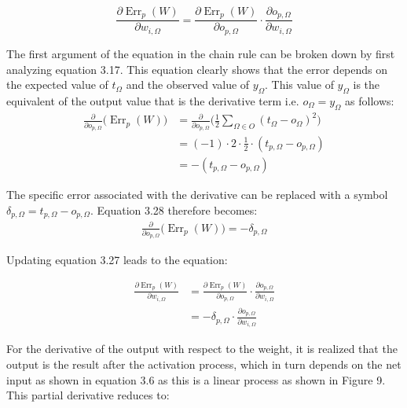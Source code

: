 \begin{equation}
\frac { \partial \operatorname { Err } _ { p } ( W ) } { \partial w _ { i , \Omega } } = \frac { \partial \operatorname { Err } _ { p } ( W ) } { \partial o _ { p , \Omega } } \cdot \frac { \partial o _ { p , \Omega } } { \partial w _ { i , \Omega } }
\end{equation}

The first argument of the equation in the chain rule can be broken down by first analyzing equation 3.17. This equation clearly shows that the error depends on the expected value of $t_{\Omega}$ and the observed value of $y_{\Omega}$. This value of $y_\Omega$ is the equivalent of the output value that is the derivative term i.e. $o_\Omega = y_\Omega$ as follows:
\begin{align}
\frac { \partial }{ \partial o _ { p , \Omega } }\Big(\operatorname { Err } _ { p } ( W )\Big) &= \frac { \partial }{ \partial o _ { p , \Omega } } \Big(\frac { 1 } { 2 } \sum _ { \Omega \in O } \left( t _ { \Omega } - o _ { \Omega } \right) ^ { 2 }\Big) \nonumber \\
&= (-1) \cdot 2 \cdot \frac{1}{2} \cdot (t_{p,\Omega} - o_{p,\Omega}) \nonumber \\
&= -(t_{p,\Omega} - o_{p,\Omega})
\end{align}

The specific error associated with the derivative can be replaced with a symbol $\delta_{p,\Omega} = t_{p, \Omega} - o_{p,\Omega}$. Equation 3.28 therefore becomes:
\begin{align}
\frac { \partial }{ \partial o _ { p , \Omega } }\Big(\operatorname { Err } _ { p } ( W )\Big) = -\delta_{p,\Omega}
\end{align}

Updating equation 3.27 leads to the equation:

\begin{align}
\frac { \partial \operatorname { Err } _ { p } ( W ) } { \partial w _ { i , \Omega } } &= \frac { \partial \operatorname { Err } _ { p } ( W ) } { \partial o _ { p , \Omega } } \cdot \frac { \partial o _ { p , \Omega } } { \partial w _ { i , \Omega } } \nonumber \\
 &= - \delta_{p,\Omega} \cdot \frac { \partial o _ { p , \Omega } } { \partial w _ { i , \Omega } }
\end{align}

For the derivative of the output with respect to the weight, it is realized that the output is the result after the activation process, which in turn depends on the net input as shown in equation 3.6 as this is a linear process as shown in Figure 9. This partial derivative reduces to:

